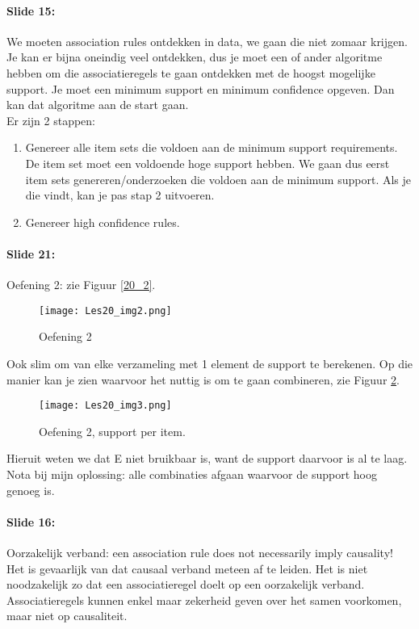 \documentclass[10pt,a4paper]{report}
\begin{document}
\paragraph{Slide 15:}We moeten association rules ontdekken in data, we gaan die niet zomaar krijgen. Je kan er bijna oneindig veel ontdekken, dus je moet een of ander algoritme hebben om die associatieregels te gaan ontdekken met de hoogst mogelijke support. Je moet een minimum support en minimum confidence opgeven. Dan kan dat algoritme aan de start gaan.\\
Er zijn 2 stappen: 
\begin{enumerate}
\item Genereer alle item sets die voldoen aan de minimum support requirements. De item set moet een voldoende hoge support hebben. We gaan dus eerst item sets genereren/onderzoeken die voldoen aan de minimum support. Als je die vindt, kan je pas stap 2 uitvoeren.
\item Genereer high confidence rules.
\end{enumerate}

\paragraph{Slide 21:}Oefening 2: zie Figuur \ref{20_2}.

\begin{figure}[ht!]
\centering
\texttt{[image: Les20\_img2.png]}
\caption{Oefening 2 \label{Les20_2}}
\end{figure}

Ook slim om van elke verzameling met 1 element de support te berekenen. Op die manier kan je zien waarvoor  het nuttig is om te gaan combineren, zie Figuur \ref{Les20_3}.

\begin{figure}[ht!]
\centering
\texttt{[image: Les20\_img3.png]}
\caption{Oefening 2, support per item. \label{Les20_3}}
\end{figure}

Hieruit weten we dat E niet bruikbaar is, want de support daarvoor is al te laag.\\
Nota bij mijn oplossing: alle combinaties afgaan waarvoor de support hoog genoeg is.

\paragraph{Slide 16:}Oorzakelijk verband: een association rule does not necessarily imply causality! Het is gevaarlijk van dat causaal verband meteen af te leiden. Het is niet noodzakelijk zo dat een associatieregel doelt op een oorzakelijk verband. Associatieregels kunnen enkel maar zekerheid geven over het samen voorkomen, maar niet op causaliteit.
\end{document}
